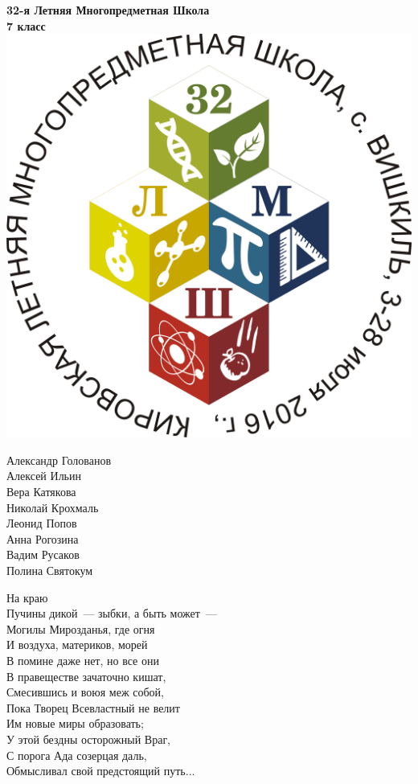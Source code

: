 \documentclass[10pt]{book}
\begin{document}
\begin{center}
	\Huge{\bf 32-я Летняя Многопредметная Школа}\\
	\Large{\bf 7 класс}\\ \vspace{.3cm}
	\includegraphics[width=\textwidth]{logo}
	\begin{multicols}{2}
		Александр Голованов \\
		Алексей Ильин \\
		Вера Катякова \\
		Николай Крохмаль \\
		Леонид Попов \\
		Анна Рогозина \\
		Вадим Русаков \\
		Полина Святокум \\
	\end{multicols}
\end{center}

\clearpage

\begin{center}
На краю \\
Пучины дикой~--- зыбки, а быть может~--- \\
Могилы Мирозданья, где огня\\
И воздуха, материков, морей\\
В помине даже нет, но все они\\
В правеществе зачаточно кишат,\\
Смесившись и воюя меж собой,\\
Пока Творец Всевластный не велит\\
Им новые миры образовать;\\
У этой бездны осторожный Враг,\\
С порога Ада созерцая даль,\\
Обмысливал свой предстоящий путь...
\end{center}
\end{document}
